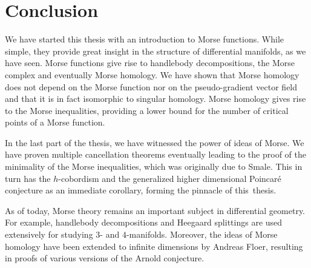 \chapter*{Conclusion}
\label{ch:conclusion}

We have started this thesis with an introduction to Morse functions.
While simple, they provide great insight in the structure of differential manifolds, as we have seen.
Morse functions give rise to handlebody decompositions, the Morse complex and eventually Morse homology.
We have shown that Morse homology does not depend on the Morse function nor on the pseudo-gradient vector field and that it is in fact isomorphic to singular homology.
Morse homology gives rise to the Morse inequalities, providing a lower bound for the number of critical points of a Morse function.

In the last part of the thesis, we have witnessed the power of ideas of Morse.
We have proven multiple cancellation theorems eventually leading to the proof of the minimality of the Morse inequalities, which was originally due to Smale.
This in turn has the $h$-cobordism and the generalized higher dimensional Poincaré conjecture as an immediate corollary, forming the pinnacle of this~thesis.

As of today, Morse theory remains an important subject in differential geometry.
For example, handlebody decompositions and Heegaard splittings are used extensively for studying $3$- and $4$-manifolds.
Moreover, the ideas of Morse homology have been extended to infinite dimensions by Andreas Floer, resulting in proofs of various versions of the Arnold conjecture.
